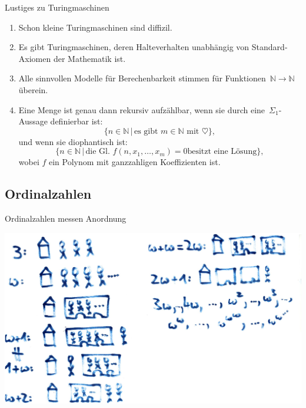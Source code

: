 \documentclass[12pt,compress,ngerman,utf8,t]{beamer}
\newcommand{\NN}{\mathbb{N}}
\begin{document}
\begin{frame}{Lustiges zu Turingmaschinen}
  \begin{enumerate}
    \item Schon kleine Turingmaschinen sind diffizil.
    \item Es gibt Turingmaschinen, deren Halteverhalten unabhängig von
    Standard-Axiomen der Mathematik ist.
    \pause

    \item Alle sinnvollen Modelle für Berechenbarkeit stimmen für
    Funktionen~$\NN \to \NN$ überein.
    \pause

    \item Eine Menge ist genau dann rekursiv aufzählbar, wenn
    sie durch eine~$\Sigma_1$-Aussage definierbar ist:
    \[ \{ n \in \NN \,|\, \text{es gibt $m \in \NN$ mit $\heartsuit$} \}, \]
    \pause
    und wenn sie diophantisch ist:
    \[ \{ n \in \NN \,|\, \text{die Gl. $f(n,x_1,\ldots,x_m) = 0$
    besitzt eine Lösung} \}, \]
    wobei $f$ ein Polynom mit ganzzahligen Koeffizienten ist.
  \end{enumerate}
\end{frame}


\subsection{Ordinalzahlen}

\begin{frame}{Ordinalzahlen messen Anordnung}
  \begin{center}
    \includegraphics[width=\textwidth]{images/ordinal-intuition}
  \end{center}
\end{frame}
\end{document}
